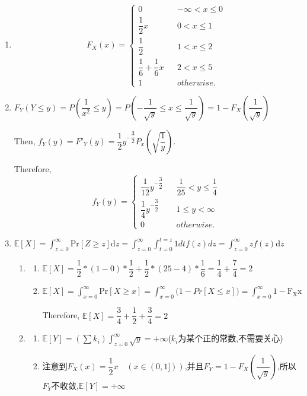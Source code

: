 \documentclass[11pt, a4paper, UTF8]{ctexart}
\begin{document}
\begin{solution}
    \begin{enumerate}
    \item $$ F_{X}(x)=\left\{
    \begin{array}{rcl}
    0       &      & {-\infty <x \leq 0 }\\
    \dfrac{1}{2}x     &      & {0<x\leq 1}\\
    \dfrac{1}{2}     &      & {1<x \leq 2}\\
    \dfrac{1}{6}+\dfrac{1}{6}x       &      & {2<x \leq 5}\\
    1 & & {otherwise.}
    \end{array} \right. $$
    \item $F_{Y}(Y\leq y)=P(\dfrac{1}{x^{2}}\leq y)=P(-\dfrac{1}{\sqrt{y}}\leq x\leq \dfrac{1}{\sqrt{y}})=1-F_{X}(\dfrac{1}{\sqrt{y}})$
    
    Then, $f_{Y}(y)=F\prime _{Y}(y)=\dfrac{1}{2}y^{-\dfrac{3}{2}}P_x(\sqrt{\dfrac{1}{y}})$.
    
    Therefore, $$ f_{Y}(y)=\left\{
    \begin{array}{rcl}
   
    \dfrac{1}{12}y^{-\dfrac{3}{2}}    &      & {\dfrac{1}{25}<y\leq \dfrac{1}{4}}\\

    \dfrac{1}{4}y^{-\dfrac{3}{2}}       &      & {1\leq y < \infty}\\
    0 & & {otherwise.}
    \end{array} \right. $$
	\item 	$\mathbb{E}[X]=\int^\infty_{z=0} \mathrm{Pr}[Z\geq z]\mathrm{d}z=\int^\infty_{z=0}\int^{t=z}_{t=0}1 dt f(z)dz=\int^\infty_{z=0} z f(z)\mathrm{d}z$
	\begin{enumerate}
	\item 
	
	\begin{enumerate}
	\item $\mathbb{E}[X]=\dfrac{1}{2}*(1-0)* \dfrac{1}{2}+\dfrac{1}{2}*(25-4)*\dfrac{1}{6}=\dfrac{1}{4}+\dfrac{7}{4}=2$
	\item $\mathbb{E}[X]=\int^\infty_{x=0} \mathrm{Pr}[X\geq x ]=\int^\infty_{x=0} \mathrm(1-{Pr}[X\leq x])=\int^\infty_{x=0} \mathrm{1-F_X{x}}$
	
	Therefore, $\mathbb{E}[X]=\dfrac{3}{4}+\dfrac{1}{2}+\dfrac{3}{4}=2$
	\end{enumerate}
	\item 
	\begin{enumerate}
	\item $\mathbb{E}[Y]=(\sum k_i)\int^\infty_{z=0}\sqrt{y}=+\infty$($k_i$为某个正的常数,不需要关心)
	\item 注意到$F_{X}(x)=\dfrac{1}{2}x\quad (x\in (0,1]))$,并且$F_{Y}=1-F_{X}(\dfrac{1}{\sqrt{y}})$,所以$F_{Y}$不收敛,$\mathbb{E}[Y]=+\infty$
	\end{enumerate}
\end{enumerate}
\end{enumerate}
    
\end{solution}
\end{document}
